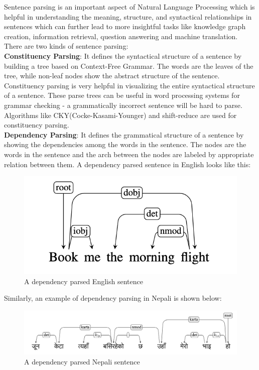 Sentence parsing is an important aspect of Natural Language Processing which is
helpful in understanding the meaning, structure, and syntactical relationships
in sentences which can further lead to more insightful tasks like knowledge
graph creation, information retrieval, question answering and machine
translation.  There are two kinds of sentence parsing:\\
    \textbf{Constituency Parsing}:
        It defines the syntactical structure of a sentence by building a tree
        based on Context-Free Grammar. The words are the leaves of the tree,
        while non-leaf nodes show the abstract structure of the sentence.
        Constituency parsing is very helpful in visualizing the entire
        syntactical structure of a sentence. These parse trees can be
        useful in word processing systems for grammar checking - a
        grammatically incorrect sentence will be hard to parse. Algorithms like
        CKY(Cocke-Kasami-Younger) and shift-reduce are used for constituency
        parsing. \\
    \textbf{Dependency Parsing}:
        It defines the grammatical structure of a sentence by showing the
        dependencies among the words in the sentence. The nodes are the words
        in the sentence and the arch between the nodes are labeled by
        appropriate relation between them. A dependency parsed sentence in English looks like this:
    \begin{figure}[!h]
        \center
        \includegraphics[scale=0.2]{images/dep_tree_eng_example}
        \caption{A dependency parsed English sentence\cite{stanfordLec}}
        \label{fig:dep_example}
    \end{figure}
    \newline
    Similarly, an example of dependency parsing in Nepali is shown below:
    \begin{figure}[!h]
        \center
        \includegraphics[scale=0.16]{images/dep_tree_example}
        \caption{A dependency parsed Nepali sentence\cite{yajnik1}}
        \label{fig:dep_example_eng}
    \end{figure}
